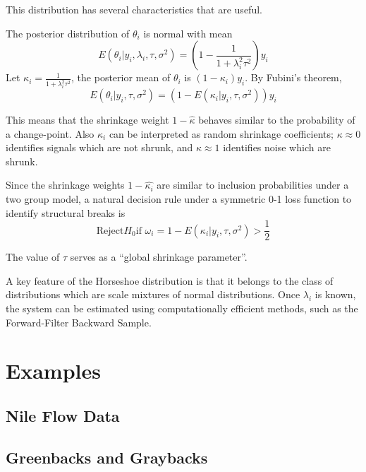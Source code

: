 \documentclass{article}
\begin{document}
This distribution has several characteristics that are useful.

The posterior distribution of $\theta_{i}$ is normal with mean
\begin{equation}
  \label{eq:4}
  E(\theta_{i} | y_{i}, \lambda_{i}, \tau, \sigma^{2}) = \left( 1 - \frac{1}{1 + \lambda_{i}^{2} \tau^{2}} \right) y_{i}
\end{equation}
Let $\kappa_{i} = \frac{1}{1 + \lambda_{i}^{2} \tau^{2}}$, the posterior mean of $\theta_{i}$ is $(1 - \kappa_{i}) y_{i}$. 
By Fubini's theorem,
\begin{equation}
  \label{eq:4}
  E(\theta_{i} | y_{i}, \tau, \sigma^{2}) = \left(1 - E(\kappa_{i} | y_{i}, \tau, \sigma^{2 })\right)y_{i}
\end{equation}

This means that the shrinkage weight $1 - \hat{\kappa}$ behaves similar to the probability of a change-point.
Also $\kappa_{i}$ can be interpreted as random shrinkage coefficients; $\kappa \approx 0$ identifies signals which 
are not shrunk, and $\kappa \approx 1$ identifies noise which are shrunk.

Since the shrinkage weights $1 - \hat{\kappa_{i}}$ are similar to inclusion probabilities under a two group model, 
a natural decision rule under a symmetric 0-1 loss function to identify structural breaks is 
\begin{equation}
  \label{eq:5}
  \text{Reject} H_{0} \text{if $\omega_{i} = 1 - E(\kappa_{i} | y_{i}, \tau, \sigma^{2})$} > \frac{1}{2}
\end{equation}

The value of $\tau$ serves as a ``global shrinkage parameter''. 

A key feature of the Horseshoe distribution is that it belongs to the class of distributions which are scale mixtures of normal distributions. 
Once $\lambda_{i}$ is known, the system can be estimated using computationally efficient methods, such as the Forward-Filter Backward Sample.

\section{Examples}
\label{sec:examples}

\subsection{Nile Flow Data}
\label{sec:nile}

\subsection{Greenbacks and Graybacks}
\label{sec:greenbacks-graybacks}
\end{document}
